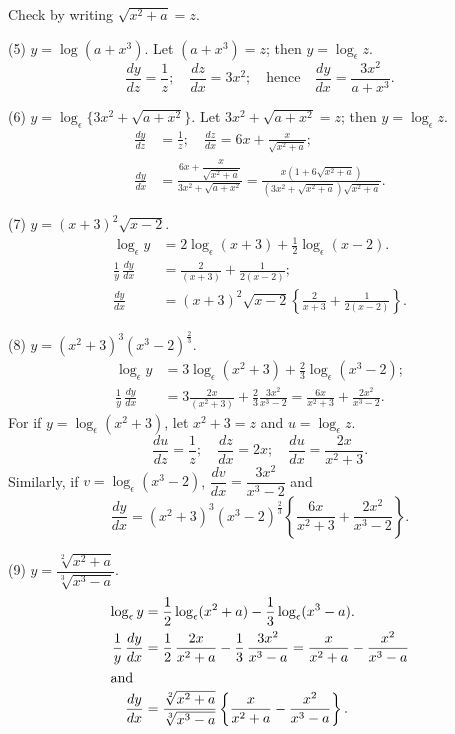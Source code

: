 \documentclass[12pt]{book}[2005/09/16]
\newcommand{\DPPageSep}[2]{\Pagelabel{#2}}
\newcommand{\Pagelabel}[1]
  {\phantomsection\label{#1}}
\newcommand{\DPchg}[2]{#2}%
\newcommand{\efrac}[2]{\frac{#1}{#2}}
\begin{document}
Check by writing $\sqrt{x^2+a}=z$.

(5) $y=\log(a+x^3)$. Let $(a+x^3)=z$; then $y=\log_\epsilon z$.
\[
\frac{dy}{dz} = \frac{1}{z};\quad
\frac{dz}{dx} = 3x^2;\quad\text{hence}\quad
\frac{dy}{dx} = \frac{3x^2}{a+x^3}.
\]

(6) $y=\log_\epsilon\{{3x^2+\sqrt{a+x^2}}\}$. Let $3x^2 + \sqrt{a+x^2}=z$;
then $y=\log_\epsilon z$.
\begin{align*}
\frac{dy}{dz}
  &= \frac{1}{z};\quad \frac{dz}{dx} = 6x + \frac{x}{\sqrt{x^2+a}}; \\
\frac{dy}{dx}
  &= \frac{6x + \dfrac{x}{\sqrt{x^2+a}}}{3x^2 + \sqrt{a+x^2}}
   = \frac{x(1 + 6\sqrt{x^2+a})}{(3x^2 + \sqrt{x^2+a}) \sqrt{x^2+a}}.
\end{align*}
\DPPageSep{164.png}{152}%

(7) $y=(x+3)^2 \sqrt{x-2}$.
\begin{align*}
\log_\epsilon y
  &= 2 \log_\epsilon(x+3)+ \tfrac{1}{2} \log_\epsilon(x-2). \\
\frac{1}{y}\, \frac{dy}{dx}
  &= \frac{2}{(x+3)} + \frac{1}{2(x-2)}; \\
\frac{dy}{dx}
  &= (x+3)^2 \sqrt{x-2} \left\{\frac{2}{x+3} + \frac{1}{2(x-2)}\right\}.
\end{align*}

(8) $y=(x^2+3)^3(x^3-2)^{\efrac{2}{3}}$.
\begin{align*}
\log_\epsilon y
  &= 3 \log_\epsilon(x^2+3) + \tfrac{2}{3} \log_\epsilon(x^3-2); \\
\frac{1}{y}\, \frac{dy}{dx}
  &= 3 \frac{2x}{(x^2+3)} + \frac{2}{3} \frac{3x^2}{x^3-2}
   = \frac{6x}{x^2+3} + \frac{2x^2}{x^3-2}.
\end{align*}
\DPchg{(}{}For if $y=\log_\epsilon(x^2+3)$, let $x^2+3=z$ and $u=\log_\epsilon z$.
\[
\frac{du}{dz} = \frac{1}{z};\quad
\frac{dz}{dx} = 2x;\quad
\frac{du}{dx} = \frac{2x}{x^2+3}.
\]
Similarly, if $v=\log_\epsilon(x^3-2)$, $\dfrac{dv}{dx} = \dfrac{3x^2}{x^3-2}$\DPchg{)}{} and
\[
\frac{dy}{dx}
  = (x^2+3)^3(x^3-2)^{\efrac{2}{3}}
    \left\{ \frac{6x}{x^2+3} + \frac{2x^2}{x^3-2} \right\}.
\]

(9) $y=\dfrac{\sqrt[2]{x^2+a}}{\sqrt[3]{x^3-a}}$.
\begin{align*}
\log_\epsilon y
  &= \frac{1}{2} \log_\epsilon(x^2+a) - \frac{1}{3} \log_\epsilon(x^3-a). \\
\frac{1}{y}\, \frac{dy}{dx}
  &= \frac{1}{2}\, \frac{2x}{x^2+a} - \frac{1}{3}\, \frac{3x^2}{x^3-a}
   = \frac{x}{x^2+a} - \frac{x^2}{x^3-a} \\
\intertext{and}
\frac{dy}{dx}
  &= \frac{\sqrt[2]{x^2+a}}{\sqrt[3]{x^3-a}}
     \left\{ \frac{x}{x^2+a} - \frac{x^2}{x^3-a} \right\}.
\end{align*}
\DPPageSep{165.png}{153}%
\end{document}
